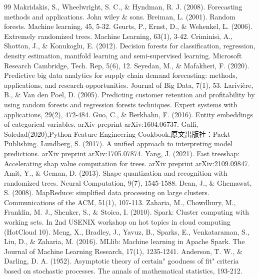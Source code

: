 \documentclass{ctexart}
\begin{document}
\clearpage %
{}
\begin{thebibliography}{99}
Makridakis, S., Wheelwright, S. C., \& Hyndman, R. J. (2008). Forecasting methods and applications. John wiley \& sons.
 Breiman, L. (2001). Random forests. Machine learning, 45, 5-32.
 Geurts, P., Ernst, D., \& Wehenkel, L. (2006). Extremely randomized trees. Machine Learning, 63(1), 3-42.
 Criminisi, A., Shotton, J., \& Konukoglu, E. (2012). Decision forests for classification, regression, density estimation, manifold learning and semi-supervised learning. Microsoft Research Cambridge, Tech. Rep, 5(6), 12.
Seyedan, M., \& Mafakheri, F. (2020). Predictive big data analytics for supply chain demand forecasting: methods, applications, and research opportunities. Journal of Big Data, 7(1), 53.
Larivière, B., \& Van den Poel, D. (2005). Predicting customer retention and profitability by using random forests and regression forests techniques. Expert systems with applications, 29(2), 472-484.
Guo, C., \& Berkhahn, F. (2016). Entity embeddings of categorical variables. arXiv preprint arXiv:1604.06737.
Galli, Soledad(2020),Python Feature Engineering Cookbook,原文出版社：Packt Publishing.
Lundberg, S. (2017). A unified approach to interpreting model predictions. arXiv preprint arXiv:1705.07874.
Yang, J. (2021). Fast treeshap: Accelerating shap value computation for trees. arXiv preprint arXiv:2109.09847.
 Amit, Y., \& Geman, D. (2013). Shape quantization and recognition with randomized trees. Neural Computation, 9(7), 1545-1588.
Dean, J., \& Ghemawat, S. (2008). MapReduce: simplified data processing on large clusters. Communications of the ACM, 51(1), 107-113.
Zaharia, M., Chowdhury, M., Franklin, M. J., Shenker, S., \& Stoica, I. (2010). Spark: Cluster computing with working sets. In 2nd USENIX workshop on hot topics in cloud computing (HotCloud 10).
 Meng, X., Bradley, J., Yavuz, B., Sparks, E., Venkataraman, S., Liu, D., \& Zaharia, M. (2016). MLlib: Machine learning in Apache Spark. The Journal of Machine Learning Research, 17(1), 1235-1241.
 Anderson, T. W., \& Darling, D. A. (1952). Asymptotic theory of certain" goodness of fit" criteria based on stochastic processes. The annals of mathematical statistics, 193-212.

\end{thebibliography}
\end{document}
